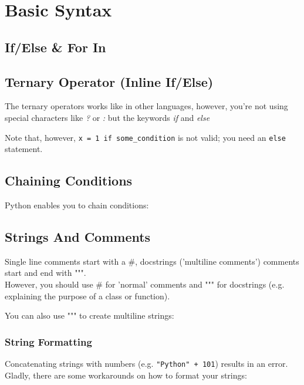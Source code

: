 \section{Basic Syntax}

  \subsection{If/Else \& For In}

  \subsection{Ternary Operator (Inline If/Else)}
    The ternary operators works like in other languages, however, you're not using special
    characters like \textit{?} or \textit{:} but the keywords \textit{if} and \textit{else}
    
    Note that, however, \texttt{x = 1 if some_condition} is not valid; you need an
    \texttt{else} statement.

  \subsection{Chaining Conditions}
    Python enables you to chain conditions:
    

  \subsection{Strings And Comments}
    Single line comments start with a \#, docstrings ('multiline comments') comments start and end with """. \\
    However, you should use \# for 'normal' comments and """ for docstrings (e.g. explaining the purpose of a class or function).
    
    You can also use """ to create multiline strings:
    
  
    \subsubsection{String Formatting}
      Concatenating strings with numbers (e.g. \texttt{"Python" + 101}) results in an error. \\
      Gladly, there are some workarounds on how to format your strings:
    
